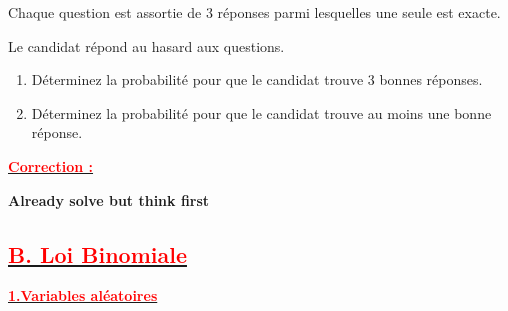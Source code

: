 \documentclass[12pt]{article}
\begin{document}
Chaque question est assortie de 3 réponses parmi lesquelles une seule est exacte.

Le candidat répond au hasard aux questions.

\begin{enumerate}
    \item Déterminez la probabilité pour que le candidat trouve 3 bonnes réponses.
    
    \item Déterminez la probabilité pour que le candidat trouve au moins une bonne réponse.
\end{enumerate}

\underline{\textbf{\textcolor{red}{Correction :}}}

\textbf{Already solve but think first}


	
    
    
    
    
    
    
    
\subsection*{\underline{\textbf{\textcolor{red}{B. Loi Binomiale}}}}
\underline{\textbf{\textcolor{red}{1.Variables aléatoires}}}
\end{document}
